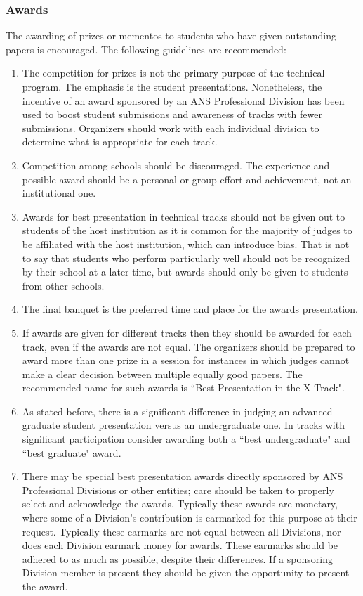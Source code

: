 \documentclass[12pt]{article}
\begin{document}
\subsubsection{Awards}
The awarding of prizes or mementos to students who have given outstanding papers is encouraged. The following guidelines are recommended:
\begin{enumerate}
    \item The competition for prizes is not the primary purpose of the technical program. The emphasis is the student presentations. Nonetheless, the incentive of an award sponsored by an ANS Professional Division has been used to boost student submissions and awareness of tracks with fewer submissions. Organizers should work with each individual division to determine what is appropriate for each track.
    \item Competition among schools should be discouraged. The experience and possible award should be a personal or group effort and achievement, not an institutional one.
    \item Awards for best presentation in technical tracks should not be given out to students of the host institution as it is common for the majority of judges to be affiliated with the host institution, which can introduce bias. That is not to say that students who perform particularly well should not be recognized by their school at a later time, but awards should only be given to students from other schools.
    \item The final banquet is the preferred time and place for the awards presentation.
    \item If awards are given for different tracks then they should be awarded for each track, even if the awards are not equal. The organizers should be prepared to award more than one prize in a session for instances in which judges cannot make a clear decision between multiple equally good papers. The recommended name for such awards is ``Best Presentation in the X Track".
    \item As stated before, there is a significant difference in judging an advanced graduate student presentation versus an undergraduate one. In tracks with significant participation consider awarding both a ``best undergraduate" and ``best graduate" award.
    \item There may be special best presentation awards directly sponsored by ANS Professional Divisions or other entities; care should be taken to properly select and acknowledge the awards. Typically these awards are monetary, where some of a Division's contribution is earmarked for this purpose at their request. Typically these earmarks are not equal between all Divisions, nor does each Division earmark money for awards. These earmarks should be adhered to as much as possible, despite their differences. If a sponsoring Division member is present they should be given the opportunity to present the award.

\end{enumerate}
\end{document}
